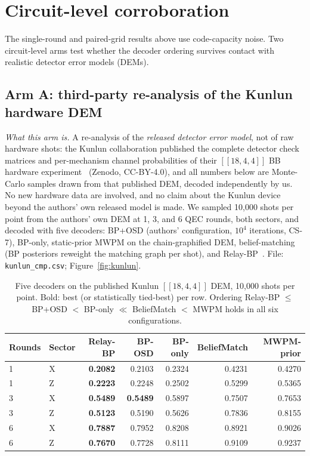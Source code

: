 \documentclass[11pt,a4paper]{article}
\begin{document}
\section{Circuit-level corroboration}
\label{sec:circuit}

The single-round and paired-grid results above use code-capacity noise.
Two circuit-level arms test whether the decoder ordering survives contact
with realistic detector error models (DEMs).

\subsection{Arm A: third-party re-analysis of the Kunlun hardware DEM}

\emph{What this arm is.} A re-analysis of the \emph{released detector
error model}, not of raw hardware shots: the Kunlun collaboration
published the complete detector check matrices and
per-mechanism channel probabilities of their $[[18,4,4]]$ BB hardware
experiment~\cite{Wang2026kunlun} (Zenodo, CC-BY-4.0), and all numbers
below are Monte-Carlo samples drawn from that published DEM, decoded
independently by us. No new hardware data are involved, and no claim
about the Kunlun device beyond the authors' own released model is made.
We sampled
10{,}000 shots per point from the authors' own DEM at 1, 3, and 6 QEC
rounds, both sectors, and decoded with five decoders: BP+OSD (authors'
configuration, $10^4$ iterations, CS-7), BP-only, static-prior MWPM on the
chain-graphified DEM, belief-matching~\cite{Higgott2023belief} (BP
posteriors reweight the matching graph per shot), and
Relay-BP~\cite{Muller2025relay}. File: \texttt{kunlun\_cmp.csv};
Figure~\ref{fig:kunlun}.

\begin{table}[H]\centering\small
\caption{Five decoders on the published Kunlun $[[18,4,4]]$ DEM,
  10{,}000 shots per point. Bold: best (or statistically tied-best) per row.
  Ordering Relay-BP $\leq$ BP+OSD $<$ BP-only $\ll$ BeliefMatch $<$ MWPM holds
  in all six configurations.}
\label{tab:kunlun}
\begin{tabular}{@{}llrrrrr@{}}
\toprule
Rounds & Sector & Relay-BP & BP-OSD & BP-only & BeliefMatch & MWPM-prior \\\midrule
1 & X & \textbf{0.2082} & 0.2103 & 0.2324 & 0.4231 & 0.4270 \\
1 & Z & \textbf{0.2223} & 0.2248 & 0.2502 & 0.5299 & 0.5365 \\
3 & X & \textbf{0.5489} & \textbf{0.5489} & 0.5897 & 0.7507 & 0.7653 \\
3 & Z & \textbf{0.5123} & 0.5190 & 0.5626 & 0.7836 & 0.8155 \\
6 & X & \textbf{0.7887} & 0.7952 & 0.8208 & 0.8921 & 0.9026 \\
6 & Z & \textbf{0.7670} & 0.7728 & 0.8111 & 0.9109 & 0.9237 \\
\bottomrule
\end{tabular}
\end{table}
\end{document}
